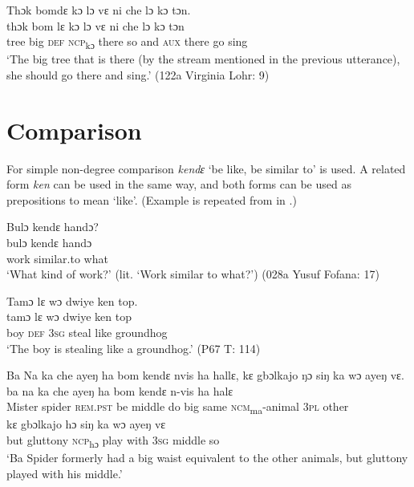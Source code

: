 \ea%
    \label{ex:228}
    Thɔk bomdɛ kɔ lɔ vɛ ni che lɔ kɔ tɔn.\\
    \gll thɔk  bom  lɛ    kɔ    lɔ    vɛ  ni    che  lɔ    kɔ     tɔn\\
    tree  big  \textsc{def}  \textsc{ncp}\textsubscript{kɔ}  there  so  and  \textsc{aux}  there  go   sing\\
    \glt ‘The big tree that is there (by the stream mentioned in the previous utterance), she should go there and sing.' (122a Virginia Lohr: 9)
\z

\section{Comparison}
\label{sec:9.2}\hypertarget{Toc115517821}{}
For simple non-degree comparison \textit{kendɛ} ‘be like, be similar to' is used. A related form \textit{ken} can be used in the same way, and both forms can be used as prepositions to mean ‘like'. (Example  is repeated from  in .)

\ea%
    \label{ex:229}
    \ea\label{ex:229a}  Bulɔ kendɛ handɔ?\\
    \gll bulɔ  kendɛ      handɔ\\
    work  similar.to  what\\
    \glt ‘What kind of work?' (lit. ‘Work similar to what?') (028a Yusuf Fofana: 17)

    \ex\label{ex:229b}  Tamɔ lɛ wɔ dwiye ken top.\\
    \gll tamɔ    lɛ    wɔ    dwiye  ken    top\\
    boy    \textsc{def}  \textsc{3sg}  steal    like    groundhog\\
    \glt ‘The boy is stealing like a groundhog.'\footnotemark {}  (P67 T: 114)

    \ex\label{ex:229c}  Ba Na ka che ayeŋ ha bom kendɛ nvis ha hallɛ, kɛ gbɔlkajo ŋɔ siŋ ka wɔ ayeŋ vɛ.\\
    \gll ba      na    ka      che  ayeŋ    ha    bom  kendɛ    n-vis        ha    halɛ\\
    Mister  spider \textsc{rem.pst}  be    middle  do    big  same    \textsc{ncm}\textsubscript{ma}{}-animal  \textsc{3pl}  other\\
    \gll kɛ    gbɔlkajo    hɔ      siŋ    ka    wɔ    ayeŋ    vɛ\\
    but  gluttony    \textsc{ncp}\textsubscript{hɔ}    play  with  \textsc{3sg}  middle  so\\
    \glt ‘Ba Spider formerly had a big waist equivalent to the other animals, but gluttony played with his middle.' \citep[32]{Sumner1921}
\z
\z
{}

